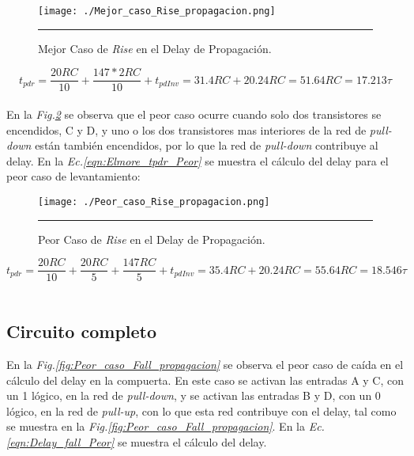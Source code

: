\documentclass[12pt,a4paper]{article} %
\begin{document}
\begin{figure}[htbp]
  \centering
    \texttt{[image: ./Mejor\_caso\_Rise\_propagacion.png]}
    \rule{35em}{0.5pt}
  \caption[IdealvsSim]{Mejor Caso de \textit{Rise} en el Delay de Propagación.}
  \label{fig:Mejor_caso_Rise_propagacion}
\end{figure}

\begin{equation}\label{eqn:Elmore_tpdr_Mejor}
t_{pdr} = \frac{20RC}{10} + \frac{147*2RC}{10} + t_{pdInv}= 31.4RC + 20.24RC = 51.64RC = 17.213\tau
\end{equation}\\

En la \textit{Fig.\ref{fig:Peor_caso_Rise_propagacion}} se observa que el peor caso ocurre cuando solo dos transistores se encendidos, C y D, y uno o los dos transistores mas interiores de la red de \textit{pull-down} están también encendidos, por lo que la red de \textit{pull-down} contribuye al delay. En la \textit{Ec.\ref{eqn:Elmore_tpdr_Peor}} se muestra el cálculo del delay para el peor caso de levantamiento:\\

\begin{figure}[htbp]
  \centering
    \texttt{[image: ./Peor\_caso\_Rise\_propagacion.png]}
    \rule{35em}{0.5pt}
  \caption[IdealvsSim]{Peor Caso de \textit{Rise} en el Delay de Propagación.}
  \label{fig:Peor_caso_Rise_propagacion}
\end{figure}

\begin{equation}\label{eqn:Elmore_tpdr_Peor}
t_{pdr} = \frac{20RC}{10}+\frac{20RC}{5}+\frac{147RC}{5}+t_{pdInv}= 35.4RC + 20.24RC = 55.64RC = 18.546\tau
\end{equation}\\

\subsection{Circuito completo}

En la \textit{Fig.\ref{fig:Peor_caso_Fall_propagacion}} se observa el peor caso de caída en el cálculo del delay en la compuerta. En este caso se activan las entradas A y C, con un 1 lógico, en la red de \textit{pull-down}, y se activan las entradas B y D, con un 0 lógico, en la red de \textit{pull-up}, con lo que esta red contribuye con el delay, tal como se muestra en la \textit{Fig.\ref{fig:Peor_caso_Fall_propagacion}}. En la \textit{Ec.\ref{eqn:Delay_fall_Peor}} se muestra el cálculo del delay.\\
\end{document}
